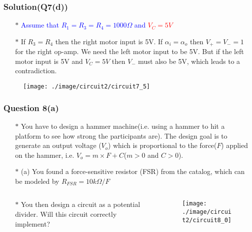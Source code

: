 \documentclass{beamer}
\newcommand{\blue}[1]{\textcolor{blue}{#1}}
\newcommand{\red}[1]{\textcolor{red}{#1}}
\begin{document}
\begin{frame}
\frametitle{Solution(Q7(d))}
\begin{itemize} \itemsep2pt \parskip0pt 
  \item[$\ast$] \blue{Assume that $R_1 = R_3 = R_4 = 1000\Omega$ and} \red{$V_C = 5V$}
  \item[$\ast$] If $R_3 = R_4$ then the right motor input is 5V. If $\alpha_i = \alpha_o$ then $V_+ = V_- = 1$ for the right op-amp. We need the left motor input to be 5V. But if the left motor input is 5V and $V_C = 5V$ then $V_-$ must also be 5V, which leads to a contradiction.
\end{itemize}


\begin{figure}[H]
  \centering
  \texttt{[image: ./image/circuit2/circuit7\_5]}
\end{figure}

\end{frame}


\begin{frame}
\frametitle{Question 8(a)}
\begin{itemize} \itemsep1pt \parskip0pt 
  \item[$\ast$] You have to design a hammer machine(i.e. using a hammer to hit a platform to see how strong the participants are). The design goal is to generate an output voltage ($V_o$) which is proportional to the force($F$) applied on the hammer, i.e. $V_o = m \times F + C$($m > 0$ and $C > 0$).
  \item[$\ast$] (a) You found a force-sensitive resistor (FSR) from the catalog, which can be modeled by $R_{FSR} = 10k\Omega/F$
\end{itemize}

\begin{columns}

\begin{column}{6cm}
\begin{itemize} \itemsep1pt \parskip0pt 
  \item[$\ast$] You then design a circuit as a potential divider. Will this circuit correctly implement?
\end{itemize}
\end{column}


\begin{column}{6cm}
\begin{figure}[H]
  \centering
  \texttt{[image: ./image/circuit2/circuit8\_0]}
\end{figure}
\end{column}

\end{columns}

\end{frame}
\end{document}
